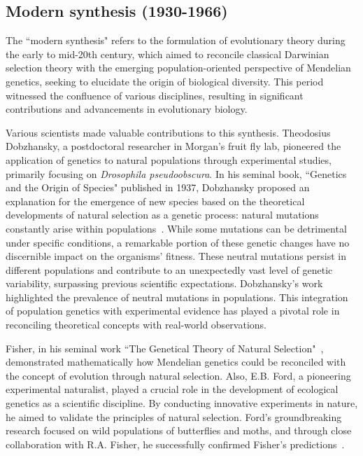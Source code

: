 \subsection{Modern synthesis (1930-1966)}

The “modern synthesis" refers to the formulation of evolutionary theory during the early to mid-20th century, which aimed to reconcile classical Darwinian selection theory with the emerging population-oriented perspective of Mendelian genetics, seeking to elucidate the origin of biological diversity. This period witnessed the confluence of various disciplines, resulting in significant contributions and advancements in evolutionary biology.

Various scientists made valuable contributions to this synthesis. Theodosius Dobzhansky, a postdoctoral researcher in Morgan's fruit fly lab, pioneered the application of genetics to natural populations through experimental studies, primarily focusing on \textit{Drosophila pseudoobscura}. In his seminal book, “Genetics and the Origin of Species" published in 1937, Dobzhansky proposed an explanation for the emergence of new species based on the theoretical developments of natural selection as a genetic process: natural mutations constantly arise within populations~\citep{dobzhansky_genetics_1937, ayala_genetics_1997, barahona_theodosius_2005}. While some mutations can be detrimental under specific conditions, a remarkable portion of these genetic changes have no discernible impact on the organisms' fitness. These neutral mutations persist in different populations and contribute to an unexpectedly vast level of genetic variability, surpassing previous scientific expectations. Dobzhansky's work highlighted the prevalence of neutral mutations in populations. This integration of population genetics with experimental evidence has played a pivotal role in reconciling theoretical concepts with real-world observations.

Fisher, in his seminal work “The Genetical Theory of Natural Selection"~\citep{fisher_genetical_1930, leigh_modern_1999}, demonstrated mathematically how Mendelian genetics could be reconciled with the concept of evolution through natural selection. Also, E.B. Ford, a pioneering experimental naturalist, played a crucial role in the development of ecological genetics as a scientific discipline. By conducting innovative experiments in nature, he aimed to validate the principles of natural selection. Ford's groundbreaking research focused on wild populations of butterflies and moths, and through close collaboration with R.A. Fisher, he successfully confirmed Fisher's predictions~\citep{fisher_spread_1947, ford_butterflies_1945, baxter_eb_2017}.

